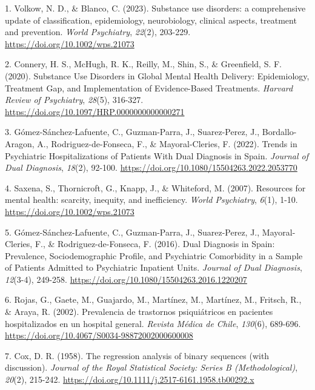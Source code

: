 \documentclass[
  spanish,
  10pt,
]{article}
\newlength{\cslhangindent}
\newenvironment{CSLReferences}[2] %
 {\begin{list}{}{%
  \setlength{\itemindent}{0pt}
  \setlength{\leftmargin}{0pt}
  \setlength{\parsep}{0pt}
  \ifodd #1
   \setlength{\leftmargin}{\cslhangindent}
   \setlength{\itemindent}{-1\cslhangindent}
  \fi
  \setlength{\itemsep}{#2\baselineskip}}}
 {\end{list}}
\begin{document}
\label{refs}
\begin{CSLReferences}{1}{0}
1. Volkow, N. D., \& Blanco, C. (2023). Substance use disorders: a
comprehensive update of classification, epidemiology, neurobiology,
clinical aspects, treatment and prevention. \emph{World Psychiatry},
\emph{22}(2), 203-229. \url{https://doi.org/10.1002/wps.21073}

2. Connery, H. S., McHugh, R. K., Reilly, M., Shin, S., \& Greenfield,
S. F. (2020). Substance Use Disorders in Global Mental Health Delivery:
Epidemiology, Treatment Gap, and Implementation of Evidence-Based
Treatments. \emph{Harvard Review of Psychiatry}, \emph{28}(5), 316-327.
\url{https://doi.org/10.1097/HRP.0000000000000271}

3. Gómez-Sánchez-Lafuente, C., Guzman-Parra, J., Suarez-Perez, J.,
Bordallo-Aragon, A., Rodriguez-de-Fonseca, F., \& Mayoral-Cleries, F.
(2022). Trends in Psychiatric Hospitalizations of Patients With Dual
Diagnosis in Spain. \emph{Journal of Dual Diagnosis}, \emph{18}(2),
92-100. \url{https://doi.org/10.1080/15504263.2022.2053770}

4. Saxena, S., Thornicroft, G., Knapp, J., \& Whiteford, M. (2007).
Resources for mental health: scarcity, inequity, and inefficiency.
\emph{World Psychiatry}, \emph{6}(1), 1-10.
\url{https://doi.org/10.1002/wps.21073}

5. Gómez-Sánchez-Lafuente, C., Guzman-Parra, J., Suarez-Perez, J.,
Mayoral-Cleries, F., \& Rodriguez-de-Fonseca, F. (2016). Dual Diagnosis
in Spain: Prevalence, Sociodemographic Profile, and Psychiatric
Comorbidity in a Sample of Patients Admitted to Psychiatric Inpatient
Units. \emph{Journal of Dual Diagnosis}, \emph{12}(3-4), 249-258.
\url{https://doi.org/10.1080/15504263.2016.1220207}

6. Rojas, G., Gaete, M., Guajardo, M., Martínez, M., Martínez, M.,
Fritsch, R., \& Araya, R. (2002). Prevalencia de trastornos
psiquiátricos en pacientes hospitalizados en un hospital general.
\emph{Revista M{é}dica de Chile}, \emph{130}(6), 689-696.
\url{https://doi.org/10.4067/S0034-98872002000600008}

7. Cox, D. R. (1958). The regression analysis of binary sequences (with
discussion). \emph{Journal of the Royal Statistical Society: Series B
(Methodological)}, \emph{20}(2), 215-242.
\url{https://doi.org/10.1111/j.2517-6161.1958.tb00292.x}


\end{CSLReferences}
\end{document}
